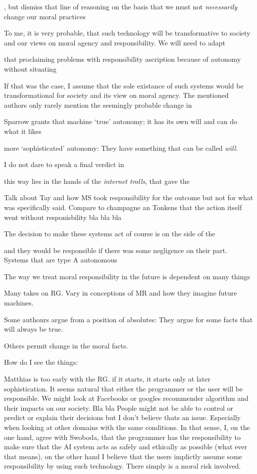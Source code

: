 \documentclass{article}
\begin{document}
, but dismiss that
line of reasoning on the basis that we must not \textit{necessarily} change our
moral practices

To me, it is very probable, that such technology will be
transformative to society and our views on moral agency and responsibility. We
will need to adapt

that proclaiming problems with responsibility ascription because
of autonomy without situating 

If that was
the case, I assume that the sole existance of such systems would be
transformational for society and its view on moral agency. The mentioned authors
only rarely mention the seemingly probable change in 

Sparrow grants
that machine `true' autonomy; it has its own will and can do what it likes

more
`sophisticated' autonomy: They have something that can be called \textit{will}.

I do not dare to speak a final verdict in 

this way
lies in the hands of the \textit{internet trolls}, that gave the 

Talk about Tay and how MS took responsibility for the outcome but not for what
was specifically said. Compare to champagne an Tonkens that the action itself
went without responisbility bla bla bla

The decision to make these systems act of
course is on the side of the

and they
would be responsible if there was some negligence on their part.
Systems that are type A autonomous

The way we treat moral responsibility in the future is dependent on many things

Many takes on RG. Vary in conceptions of MR and how they imagine future
machines. 

Some authours argue from a position of absolutes: They argue for some facts that
will always be true.

Others permit change in the moral facts.

How do I see the things:

Matthias is too early with the RG. if it starts, it starts only at later
sophistication. It seems natural that either the programmer or the user will be
responsible. We might look at Facebooks or googles recommender algorithm and
their impacts on our society. Bla bla
People might not be able to control or predict or explain their decisions but I
don't believe thats an issue. Especially when looking at other domains with the
same conditions. In that sense, I, on the one hand, agree with Swoboda, that the
programmer has the responsibility to make sure that the AI system acts as safely
and ethically as possible (what ever that means), on the other hand I believe
that the users implictly assume some responsibility by using such technology.
There simply is a moral risk involved.
\end{document}
